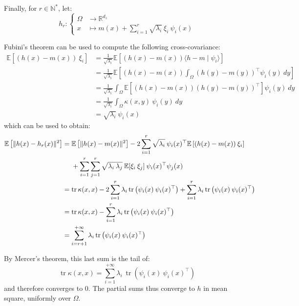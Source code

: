 Finally, for $r\in\mathbb{N}^*$, let:
\begin{equation}
	h_r:\left\{\begin{aligned}
	\Omega&\to\mathbb{R}^{d_z}\\
	x&\mapsto m(x)+\sum_{i=1}^r\sqrt{\lambda_i}\:\xi_i\:\psi_i(x)
	\end{aligned}\right.
\end{equation}

Fubini's theorem can be used to compute the following cross-covariance:
\begin{equation}
	\begin{aligned}
	\mathbb{E}\left[(h(x)-m(x))\:\xi_i\right]&=\frac{1}{\sqrt{\lambda_i}}\mathbb{E}[(h(x)-m(x))\langle h-m\mid\psi_i\rangle]\\
	&=\frac{1}{\sqrt{\lambda_i}}\mathbb{E}\left[(h(x)-m(x))\int_{\Omega}{(h(y)-m(y))^\top\psi_i(y)\:dy}\right]\\
	&=\frac{1}{\sqrt{\lambda_i}}\int_{\Omega}{\mathbb{E}\left[(h(x)-m(x))(h(y)-m(y))^\top\right]\psi_i(y)\:dy}\\
	&=\frac{1}{\sqrt{\lambda_i}}\int_{\Omega}{\kappa(x,y)\:\psi_i(y)\:dy}\\
	&=\sqrt{\lambda_i}\:\psi_i(x)
	\end{aligned}
\end{equation}
which can be used to obtain:
\begin{equation}
	\begin{aligned}
	\mathbb{E}\left[\|h(x)-h_r(x)\|^2\right]&=\mathbb{E}\left[\|h(x)-m(x)\|^2\right]-2\sum_{i=1}^r\sqrt{\lambda_i}\:\psi_i(x)^\top\mathbb{E}\left[(h(x)-m(x))\:\xi_i\right]\\
	&\phantom{{}={}}+\sum_{i=1}^r\sum_{j=1}^r\sqrt{\lambda_i\:\lambda_j}\:\mathbb{E}[\xi_i\:\xi_j]\:\psi_i(x)^\top\psi_j(x)\\
	&=\operatorname{tr}\kappa(x,x)-2\sum_{i=1}^r\lambda_i\operatorname{tr}\left(\psi_i(x)\:\psi_i(x)^\top\right)+\sum_{i=1}^r\lambda_i\operatorname{tr}\left(\psi_i(x)\:\psi_i(x)^\top\right)\hspace{-8pt}\\
	&=\operatorname{tr}\kappa(x,x)-\sum_{i=1}^r\lambda_i\operatorname{tr}\left(\psi_i(x)\:\psi_i(x)^\top\right)\\
	&=\sum_{i=r+1}^{+\infty}\lambda_i\operatorname{tr}\left(\psi_i(x)\:\psi_i(x)^\top\right)
	\end{aligned}
\end{equation}

By Mercer's theorem, this last sum is the tail of:
\begin{equation}
	\operatorname{tr}\kappa(x,x)=\sum_{i=1}^{+\infty}\lambda_i\:\operatorname{tr}\left(\psi_i(x)\:\psi_i(x)^\top\right)
\end{equation}
and therefore converges to 0. The partial sums thus converge to $h$ in mean square, uniformly over $\Omega$.

